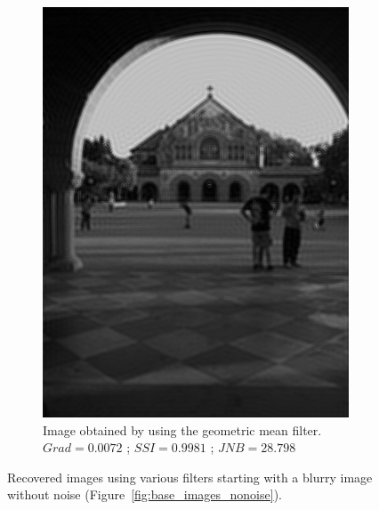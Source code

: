 \begin{figure}[H]
\begin{subfigure}[b]{0.35\textwidth}
                         \includegraphics[width=\textwidth]{memchu_geo.jpg}
                         \caption{Image obtained by using the geometric mean filter.\newline $Grad=0.0072$ ; $SSI=0.9981$ ; $JNB=28.798$}
        \end{subfigure} 
        
        \caption{Recovered images using various filters starting with a blurry image without noise (Figure~\ref{fig:base_images_nonoise}).}
        \label{filtered_images_nonoise}
\end{figure}

